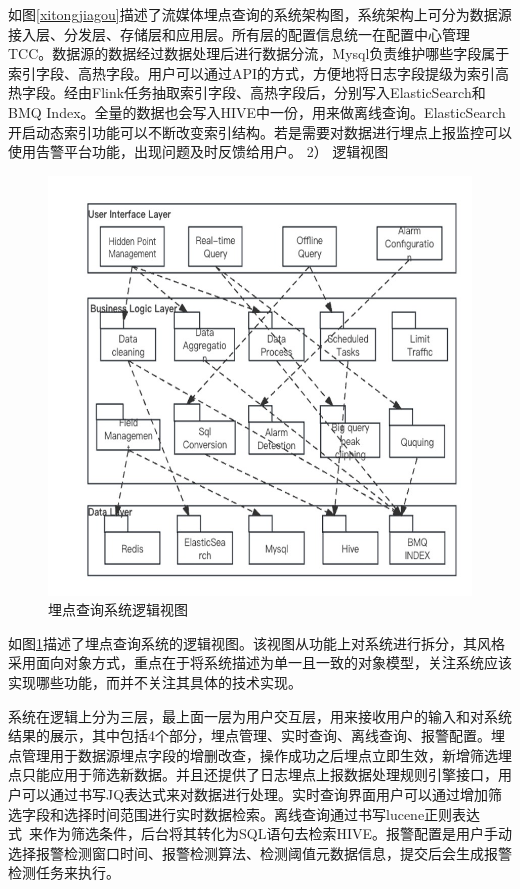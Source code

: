 如图\ref{xitongjiagou}描述了流媒体埋点查询的系统架构图，系统架构上可分为数据源接入层、分发层、存储层和应用层。所有层的配置信息统一在配置中心管理TCC。数据源的数据经过数据处理后进行数据分流，Mysql负责维护哪些字段属于索引字段、高热字段。用户可以通过API的方式，方便地将日志字段提级为索引高热字段。经由Flink任务抽取索引字段、高热字段后，分别写入ElasticSearch和BMQ Index。全量的数据也会写入HIVE中一份，用来做离线查询。ElasticSearch开启动态索引功能可以不断改变索引结构。若是需要对数据进行埋点上报监控可以使用告警平台功能，出现问题及时反馈给用户。
2）	逻辑视图
 \begin{figure}[htb]
  \centering
  \includegraphics[width=5in]{figure/chapter4/系统逻辑视图.jpg}
  \caption{埋点查询系统逻辑视图}\label{xitongluoji}
\end{figure}

如图\ref{xitongluoji}描述了埋点查询系统的逻辑视图。该视图从功能上对系统进行拆分，其风格采用面向对象方式，重点在于将系统描述为单一且一致的对象模型，关注系统应该实现哪些功能，而并不关注其具体的技术实现。

系统在逻辑上分为三层，最上面一层为用户交互层，用来接收用户的输入和对系统结果的展示，其中包括4个部分，埋点管理、实时查询、离线查询、报警配置。埋点管理用于数据源埋点字段的增删改查，操作成功之后埋点立即生效，新增筛选埋点只能应用于筛选新数据。并且还提供了日志埋点上报数据处理规则引擎接口，用户可以通过书写JQ表达式来对数据进行处理。实时查询界面用户可以通过增加筛选字段和选择时间范围进行实时数据检索。离线查询通过书写lucene正则表达式~\cite{qian2010evaluation}来作为筛选条件，后台将其转化为SQL语句去检索HIVE。报警配置是用户手动选择报警检测窗口时间、报警检测算法、检测阈值元数据信息，提交后会生成报警检测任务来执行。

